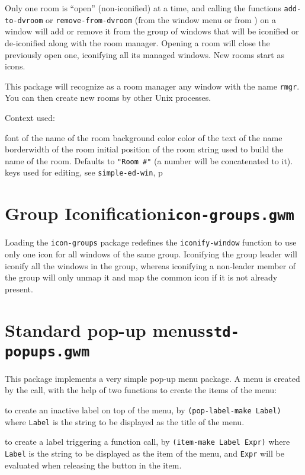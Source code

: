 Only one room is ``open'' (non-iconified) at a time, and calling the
functions \verb"add-to-dvroom" or \verb"remove-from-dvroom" (from the
window menu or from {\WOOL}) on a window will add or remove it from the group
of windows that will be iconified or de-iconified along with the room manager.
Opening a room will close the previously open one, iconifying all its managed
windows. New rooms start as icons.

This package will recognize as a room manager any window with the name 
\verb"rmgr". You can then create new rooms by other Unix processes.

Context used:
\begin{description}
 font of the name of the room
 background color
 color of the text of the name
 borderwidth of the room
 initial position of the room
 string used to build the name of the room. Defaults
to \verb|"Room #"| (a number will be concatenated to it).
 keys used
for editing, see \verb"simple-ed-win", p~\pageref{simple-ed-win}
\end{description}

\section{Group Iconification\hfill{\tt icon-groups.gwm}}
\label{icon-groups}

Loading the {\tt icon-groups} package redefines the {\tt iconify-window}
function to use only one icon for all windows of the same group. Iconifying
the group leader will iconify all the windows in the group, whereas
iconifying a non-leader member of the group will only unmap it and map the
common icon if it is not already present.

\section{Standard pop-up menus\hfill{\tt std-popups.gwm}}
\label{std-popups}

This package implements a very simple pop-up menu package. A menu is created
by the  call, with the help of two functions to create the
items of the menu:

\begin{description}

 to create an inactive label on top of the menu, by
\verb|(pop-label-make Label)| where \verb"Label" is the string to be
displayed as the title of the menu.

 to create a label triggering a {\WOOL} function call, by
\verb|(item-make Label Expr)| where \verb"Label" is the string to be
displayed as the item of the menu, and \verb"Expr" will be evaluated when
releasing the button in the item.

\end{description}


